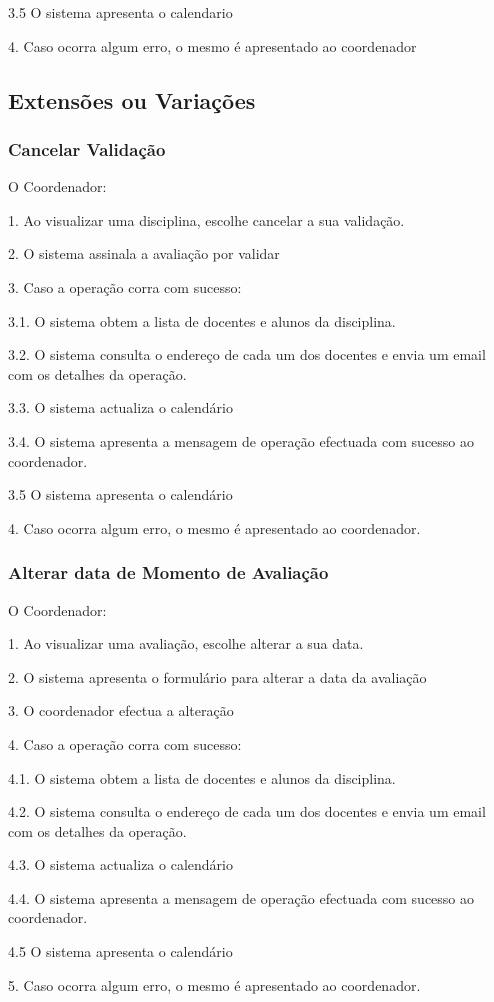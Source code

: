 3.5 O sistema apresenta o calendario

4. Caso ocorra algum erro, o mesmo é apresentado ao coordenador

\subsection{Extensões ou Variações} 
\subsubsection{Cancelar Validação}

O Coordenador:

1. Ao visualizar uma disciplina, escolhe cancelar a sua validação.

2. O sistema assinala a avaliação por validar

3. Caso a operação corra com sucesso:

3.1. O sistema obtem a lista de docentes e alunos da disciplina.

3.2. O sistema consulta o endereço de cada um dos docentes e envia um email com os detalhes da operação.

3.3. O sistema actualiza o calendário

3.4. O sistema apresenta a mensagem de operação efectuada com sucesso ao coordenador.

3.5 O sistema apresenta o calendário

4. Caso ocorra algum erro, o mesmo é apresentado ao coordenador.

\subsubsection{Alterar data de Momento de Avaliação}

O Coordenador:

1. Ao visualizar uma avaliação, escolhe alterar a sua data.

2. O sistema apresenta o formulário para alterar a data da avaliação

3. O coordenador efectua a alteração

4. Caso a operação corra com sucesso:

4.1. O sistema obtem a lista de docentes e alunos da disciplina.

4.2. O sistema consulta o endereço de cada um dos docentes e envia um email com os detalhes da operação.

4.3. O sistema actualiza o calendário

4.4. O sistema apresenta a mensagem de operação efectuada com sucesso ao coordenador.

4.5 O sistema apresenta o calendário

5. Caso ocorra algum erro, o mesmo é apresentado ao coordenador.